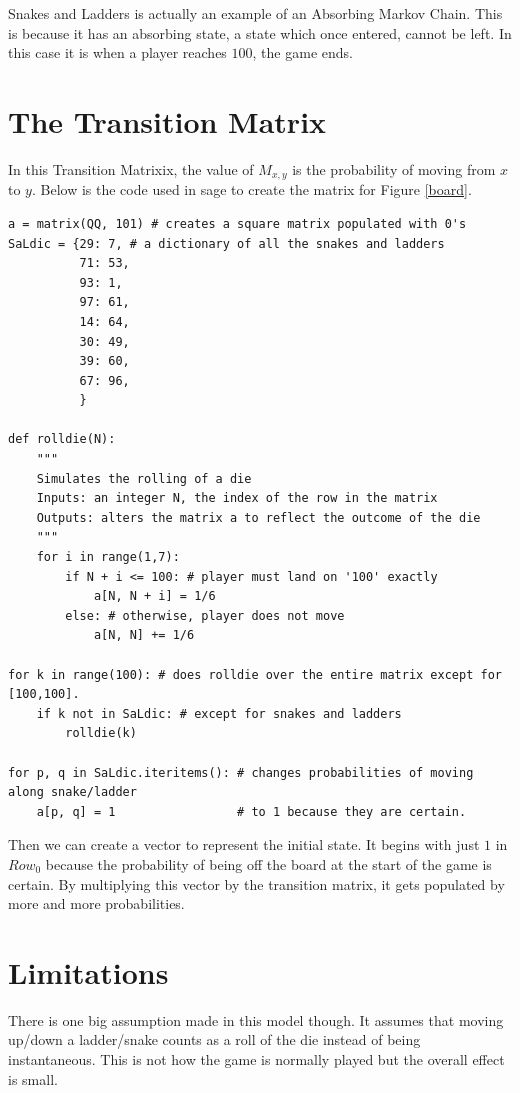 \documentclass[a4paper]{article}
\begin{document}
Snakes and Ladders is actually an example of an Absorbing Markov Chain. This is because it has an absorbing state, a state which once entered, cannot be left. In this case it is when a player reaches $100$, the game ends.

\section{The Transition Matrix}
In this Transition Matrixix, the value of $M_{x,y}$ is the probability of moving from $x$ to $y$. Below is the code used in sage to create the matrix for Figure \ref{board}.

\begin{verbatim}
a = matrix(QQ, 101) # creates a square matrix populated with 0's
SaLdic = {29: 7, # a dictionary of all the snakes and ladders
          71: 53,
          93: 1,
          97: 61,
          14: 64,
          30: 49,
          39: 60,
          67: 96,
          }

def rolldie(N):
    """
    Simulates the rolling of a die
    Inputs: an integer N, the index of the row in the matrix
    Outputs: alters the matrix a to reflect the outcome of the die
    """
    for i in range(1,7):
        if N + i <= 100: # player must land on '100' exactly
            a[N, N + i] = 1/6
        else: # otherwise, player does not move
            a[N, N] += 1/6

for k in range(100): # does rolldie over the entire matrix except for [100,100].
    if k not in SaLdic: # except for snakes and ladders
        rolldie(k)

for p, q in SaLdic.iteritems(): # changes probabilities of moving along snake/ladder
    a[p, q] = 1                 # to 1 because they are certain.
\end{verbatim}

Then we can create a vector to represent the initial state. It begins with just $1$ in $Row_0$ because the probability of being off the board at the start of the game is certain. By multiplying this vector by the transition matrix, it gets populated by more and more probabilities.

\section{Limitations}
There is one big assumption made in this model though. It assumes that moving up/down a ladder/snake counts as a roll of the die instead of being instantaneous. This is not how the game is normally played but the overall effect is small.
\end{document}

